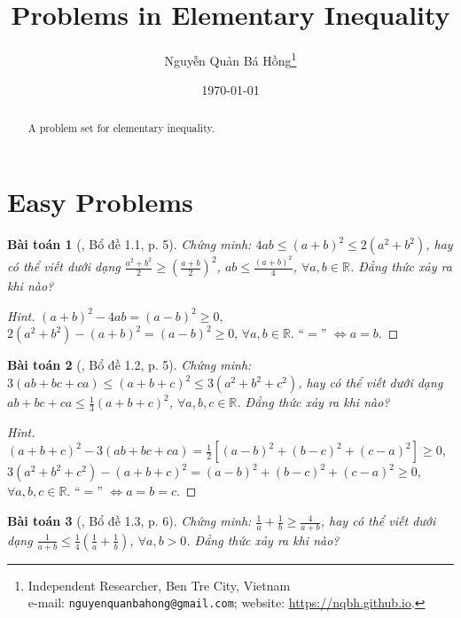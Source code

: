 \documentclass{article}
\title{Problems in Elementary Inequality}
\author{Nguyễn Quản Bá Hồng\footnote{Independent Researcher, Ben Tre City, Vietnam\\e-mail: \texttt{nguyenquanbahong@gmail.com}; website: \url{https://nqbh.github.io}.}}
\date{\today}
\numberwithin{equation}{section}
\newtheorem{baitoan}{Bài toán}[section]
\begin{document}
\maketitle
\begin{abstract}
	A problem set for elementary inequality.
\end{abstract}
\tableofcontents
\newpage


\section{Easy Problems}

\begin{baitoan}[\cite{Son_Nghiep_Trung_Can2021}, Bổ đề 1.1, p. 5]
	Chứng minh: $4ab\le(a + b)^2\le2(a^2 + b^2)$, hay có thể viết dưới dạng $\frac{a^2 + b^2}{2}\ge\left(\frac{a + b}{2}\right)^2$, $ab\le\frac{(a + b)^2}{4}$, $\forall a,b\in\mathbb{R}$. Đẳng thức xảy ra khi nào?
\end{baitoan}

\begin{proof}[Hint]
	$(a + b)^2 - 4ab = (a - b)^2\ge 0$, $2(a^2 + b^2) - (a + b)^2 = (a - b)^2\ge 0$, $\forall a,b\in\mathbb{R}$. ``$=$'' $\Leftrightarrow a = b$.
\end{proof}

\begin{baitoan}[\cite{Son_Nghiep_Trung_Can2021}, Bổ đề 1.2, p. 5]
	Chứng minh: $3(ab + bc + ca)\le(a + b + c)^2\le3(a^2 + b^2 + c^2)$, hay có thể viết dưới dạng $ab + bc + ca\le\frac{1}{3}(a + b + c)^2$, $\forall a,b,c\in\mathbb{R}$. Đẳng thức xảy ra khi nào?
\end{baitoan}

\begin{proof}[Hint]
	$(a + b + c)^2 - 3(ab + bc + ca) = \frac{1}{2}\left[(a - b)^2 + (b - c)^2 + (c - a)^2\right]\ge 0$, $3(a^2 + b^2 + c^2) - (a + b + c)^2 = (a - b)^2 + (b - c)^2 + (c - a)^2\ge 0$, $\forall a,b,c\in\mathbb{R}$. ``$=$'' $\Leftrightarrow a = b = c$.
\end{proof}

\begin{baitoan}[\cite{Son_Nghiep_Trung_Can2021}, Bổ đề 1.3, p. 6]
	Chứng minh: $\frac{1}{a} + \frac{1}{b}\ge\frac{4}{a + b}$, hay có thể viết dưới dạng $\frac{1}{a + b}\le\frac{1}{4}\left(\frac{1}{a} + \frac{1}{b}\right)$, $\forall a,b > 0$. Đẳng thức xảy ra khi nào?
\end{baitoan}
\end{document}
